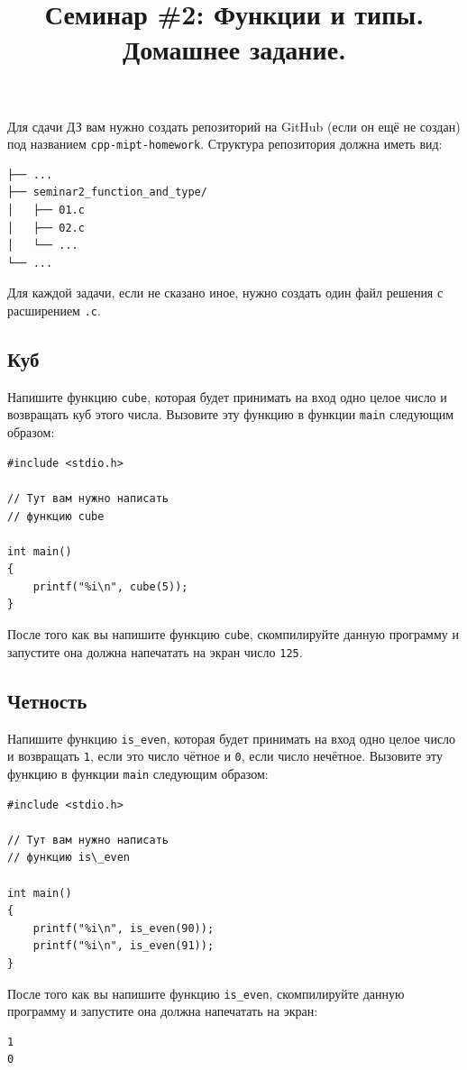 \documentclass[10pt]{article}
\begin{document}
\title{Семинар \#2: Функции и типы. Домашнее задание. \vspace{-5ex}}\date{}\maketitle
\noindent Для сдачи ДЗ вам нужно создать репозиторий на GitHub (если он ещё не создан) под названием \texttt{cpp-mipt-homework}. Структура репозитория должна иметь вид:
\begin{center}
\begin{BVerbatim}
├── ...
├── seminar2_function_and_type/
│   ├── 01.c
│   ├── 02.c
│   └── ...
└── ...
\end{BVerbatim}
\end{center}
Для каждой задачи, если не сказано иное, нужно создать один файл решения с расширением \texttt{.c}.
\subsection{Куб}
Напишите функцию \texttt{cube}, которая будет принимать на вход одно целое число и возвращать куб этого числа. Вызовите эту функцию в функции \texttt{main} следующим образом:
\begin{lstlisting}
#include <stdio.h>

// Тут вам нужно написать
// функцию cube

int main()
{
    printf("%i\n", cube(5));
}
\end{lstlisting}

После того как вы напишите функцию \texttt{cube}, скомпилируйте данную программу и запустите она должна напечатать на экран число \texttt{125}.


\subsection{Четность}
Напишите функцию \texttt{is\_even}, которая будет принимать на вход одно целое число и возвращать \texttt{1}, если это число чётное и \texttt{0}, если число нечётное. Вызовите эту функцию в функции \texttt{main} следующим образом:
\begin{lstlisting}
#include <stdio.h>

// Тут вам нужно написать
// функцию is\_even

int main()
{
    printf("%i\n", is_even(90));
    printf("%i\n", is_even(91));
}
\end{lstlisting}
После того как вы напишите функцию \texttt{is\_even}, скомпилируйте данную программу и запустите она должна напечатать на экран:
\begin{verbatim}
1
0
\end{verbatim}
\end{document}
